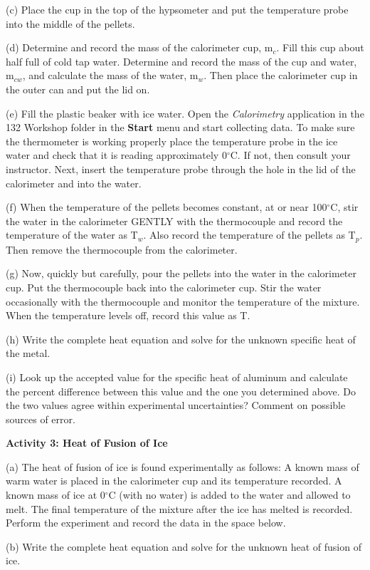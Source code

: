 (c) Place the cup in the top of the hypsometer and put the temperature
probe into the middle of the pellets.

(d) Determine and record the mass of the calorimeter cup, m\( _{c} \).
Fill this cup about half full of cold tap water. Determine and record
the mass of the cup and water, m\( _{cw} \), and calculate the mass
of the water, m\( _{w} \). Then place the calorimeter cup in the
outer can and put the lid on.
\vspace{10mm}

(e) Fill the plastic beaker with ice water. Open the \textit{Calorimetry}
application in the 132 Workshop folder in the {\bf Start} menu and start
collecting data. To make sure the thermometer is working 
properly place the temperature probe in the ice water and
check that it is reading approximately 0\( ^{\circ } \)C. If not,
then consult your instructor. Next, insert the temperature probe through
the hole in the lid of the calorimeter and into the water.

(f) When the temperature of the pellets becomes constant, at or near
100\( ^{\circ } \)C, stir the water in the calorimeter GENTLY with
the thermocouple and record the temperature of the water as T\( _{w} \).
Also record the temperature of the pellets as T\( _{p} \). Then remove
the thermocouple from the calorimeter.
\vspace{10mm}

(g) Now, quickly but carefully, pour the pellets into the water in
the calorimeter cup. Put the thermocouple back into the calorimeter
cup. Stir the water occasionally with the thermocouple and monitor
the temperature of the mixture. When the temperature levels off, record
this value as T.
\vspace{15mm}

(h) Write the complete heat equation and solve for the unknown specific
heat of the metal. 
\vspace{2in}

(i) Look up the accepted value for the specific heat of aluminum and
calculate the percent difference between this value and the one you
determined above. Do the two values agree within experimental uncertainties?
Comment on possible sources of error.
\vspace{20mm}

\textbf{Activity 3: Heat of Fusion of Ice}

(a) The heat of fusion of ice is found experimentally as follows:
A known mass of warm water is placed in the calorimeter cup and its
temperature recorded. A known mass of ice at 0\( ^{\circ } \)C (with
no water) is added to the water and allowed to melt. The final temperature
of the mixture after the ice has melted is recorded. Perform the experiment
and record the data in the space below.
\vspace{25mm}

(b) Write the complete heat equation and solve for the unknown heat
of fusion of ice.\vspace{25mm}

